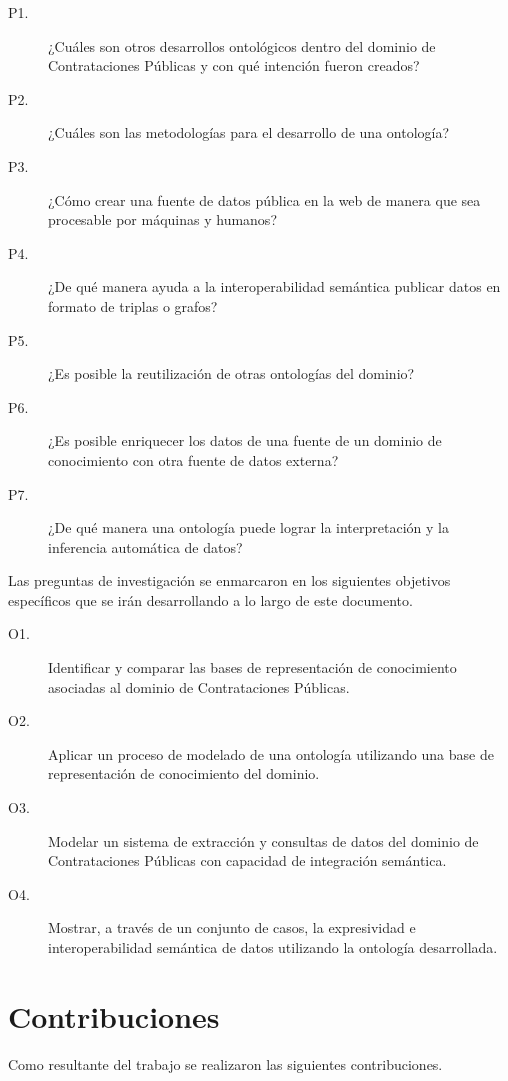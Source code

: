 \begin{description}
    \item[P1.] ¿Cuáles son otros desarrollos ontológicos dentro del dominio de Contrataciones Públicas y con qué intención fueron creados? 
    \item[P2.] ¿Cuáles son las metodologías para el desarrollo de una ontología?
    \item[P3.] ¿Cómo crear una fuente de datos pública en la web de manera que sea procesable por máquinas y humanos?
    \item[P4.] ¿De qué manera ayuda a la interoperabilidad semántica publicar datos en formato de triplas o grafos?
    \item[P5.] ¿Es posible la reutilización de otras ontologías del dominio?
    \item[P6.] ¿Es posible enriquecer los datos  de una fuente de un dominio de conocimiento con otra fuente de datos externa?
    \item[P7.] ¿De qué manera una ontología puede lograr la interpretación y la inferencia automática de datos?
    
\end{description} 

Las preguntas de investigación se enmarcaron en los siguientes objetivos específicos que se irán desarrollando a lo largo de este documento.

\begin{description}
    \item[O1.] Identificar y comparar las bases de representación de conocimiento asociadas al dominio de Contrataciones Públicas.
    \item[O2.] Aplicar un proceso de modelado de una ontología utilizando una base de representación de conocimiento del dominio.
    \item[O3.] Modelar un sistema de extracción y consultas de datos del dominio de Contrataciones Públicas con capacidad de integración semántica.
    \item[O4.] Mostrar, a través de un conjunto de casos, la expresividad e interoperabilidad semántica de datos utilizando la ontología desarrollada.
\end{description} 


\section{Contribuciones}
\label{Contribuciones}
Como resultante del trabajo se realizaron las siguientes contribuciones.

